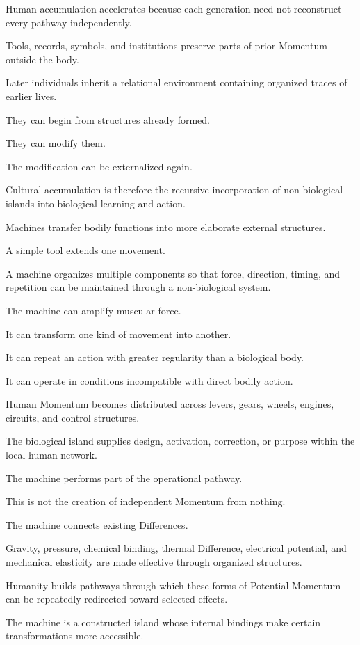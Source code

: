 Human accumulation accelerates because each generation need not reconstruct every pathway independently.

Tools, records, symbols, and institutions preserve parts of prior Momentum outside the body.

Later individuals inherit a relational environment containing organized traces of earlier lives.

They can begin from structures already formed.

They can modify them.

The modification can be externalized again.

Cultural accumulation is therefore the recursive incorporation of non-biological islands into biological learning and action.

Machines transfer bodily functions into more elaborate external structures.

A simple tool extends one movement.

A machine organizes multiple components so that force, direction, timing, and repetition can be maintained through a non-biological system.

The machine can amplify muscular force.

It can transform one kind of movement into another.

It can repeat an action with greater regularity than a biological body.

It can operate in conditions incompatible with direct bodily action.

Human Momentum becomes distributed across levers, gears, wheels, engines, circuits, and control structures.

The biological island supplies design, activation, correction, or purpose within the local human network.

The machine performs part of the operational pathway.

This is not the creation of independent Momentum from nothing.

The machine connects existing Differences.

Gravity, pressure, chemical binding, thermal Difference, electrical potential, and mechanical elasticity are made effective through organized structures.

Humanity builds pathways through which these forms of Potential Momentum can be repeatedly redirected toward selected effects.

The machine is a constructed island whose internal bindings make certain transformations more accessible.

